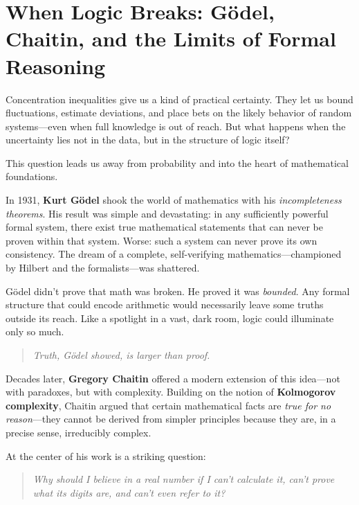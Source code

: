 \section{When Logic Breaks: Gödel, Chaitin, and the Limits of Formal Reasoning}

Concentration inequalities give us a kind of practical certainty. They let us bound fluctuations, estimate deviations, and place bets on the likely behavior of random systems—even when full knowledge is out of reach. But what happens when the uncertainty lies not in the data, but in the structure of logic itself?

This question leads us away from probability and into the heart of mathematical foundations.

In 1931, \textbf{Kurt Gödel} shook the world of mathematics with his \emph{incompleteness theorems}. His result was simple and devastating: in any sufficiently powerful formal system, there exist true mathematical statements that can never be proven within that system. Worse: such a system can never prove its own consistency. The dream of a complete, self-verifying mathematics—championed by Hilbert and the formalists—was shattered.

Gödel didn’t prove that math was broken. He proved it was \textit{bounded}. Any formal structure that could encode arithmetic would necessarily leave some truths outside its reach. Like a spotlight in a vast, dark room, logic could illuminate only so much.

\medskip

\begin{quote}
\textit{Truth, Gödel showed, is larger than proof.}
\end{quote}

\medskip

Decades later, \textbf{Gregory Chaitin} offered a modern extension of this idea—not with paradoxes, but with complexity. Building on the notion of \textbf{Kolmogorov complexity}, Chaitin argued that certain mathematical facts are \emph{true for no reason}—they cannot be derived from simpler principles because they are, in a precise sense, irreducibly complex.

At the center of his work is a striking question:

\begin{quote}
\emph{Why should I believe in a real number if I can’t calculate it, can’t prove what its digits are, and can’t even refer to it?}
\end{quote}

